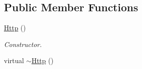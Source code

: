 \subsection*{Public Member Functions}
\begin{DoxyCompactItemize}
\item 
\hypertarget{classHttp_ace29775b1112f579a654e9ca29555994}{\hyperlink{classHttp_ace29775b1112f579a654e9ca29555994}{Http} ()}\label{classHttp_ace29775b1112f579a654e9ca29555994}

\begin{DoxyCompactList}\small\item\em Constructor. \end{DoxyCompactList}\item 
\hypertarget{classHttp_a065b6d9ce8c8286398d2391e4940e4c3}{virtual \hyperlink{classHttp_a065b6d9ce8c8286398d2391e4940e4c3}{$\sim$\+Http} ()}\label{classHttp_a065b6d9ce8c8286398d2391e4940e4c3}


\end{DoxyCompactItemize}
